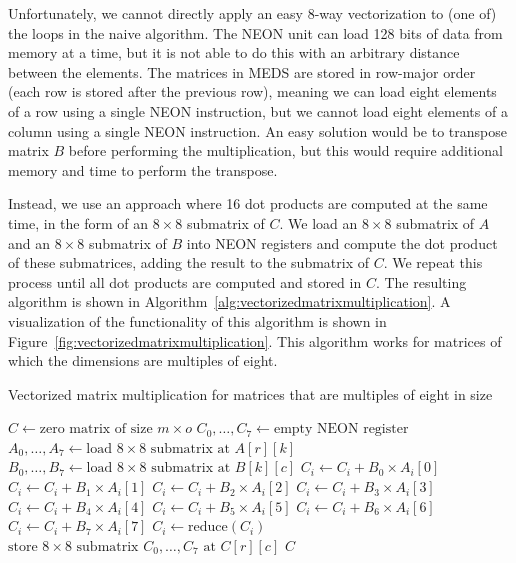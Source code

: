 \documentclass[11pt,a4paper]{report}
\theoremstyle{definition}
\begin{document}
Unfortunately, we cannot directly apply an easy 8-way vectorization to (one of) the loops in the naive algorithm. The NEON unit can load 128 bits of data from memory at a time, but it is not able to do this with an arbitrary distance between the elements. The matrices in MEDS are stored in row-major order (each row is stored after the previous row), meaning we can load eight elements of a row using a single NEON instruction, but we cannot load eight elements of a column using a single NEON instruction. An easy solution would be to transpose matrix $B$ before performing the multiplication, but this would require additional memory and time to perform the transpose.

Instead, we use an approach where 16 dot products are computed at the same time, in the form of an $8\times8$ submatrix of $C$. We load an $8\times8$ submatrix of $A$ and an $8\times8$ submatrix of $B$ into NEON registers and compute the dot product of these submatrices, adding the result to the submatrix of $C$. We repeat this process until all dot products are computed and stored in $C$. The resulting algorithm is shown in Algorithm~\ref{alg:vectorizedmatrixmultiplication}. A visualization of the functionality of this algorithm is shown in Figure~\ref{fig:vectorizedmatrixmultiplication}. This algorithm works for matrices of which the dimensions are multiples of eight.

\begin{algorithm}
  \caption{Vectorized matrix multiplication for matrices that are multiples of eight in size}
  \label{alg:vectorizedmatrixmultiplication}
  \begin{algorithmic}[1]
    \State $C \gets \text{zero matrix of size } m \times o$
    \State $C_0, \dots, C_7 \gets \text{empty NEON register}$
    \State $A_0, \dots, A_7 \gets \text{load } 8\times8 \text{ submatrix at } A[r][k]$
    \State $B_0, \dots, B_7 \gets \text{load } 8\times8 \text{ submatrix at } B[k][c]$
    \State $C_i \gets C_i + B_0 \times A_i[0]$
    \State $C_i \gets C_i + B_1 \times A_i[1]$
    \State $C_i \gets C_i + B_2 \times A_i[2]$
    \State $C_i \gets C_i + B_3 \times A_i[3]$
    \State $C_i \gets C_i + B_4 \times A_i[4]$
    \State $C_i \gets C_i + B_5 \times A_i[5]$
    \State $C_i \gets C_i + B_6 \times A_i[6]$
    \State $C_i \gets C_i + B_7 \times A_i[7]$
    \EndFor
    \EndFor
    \State $C_i \gets \text{reduce}(C_i)$
    \EndFor
    \State $\text{store } 8\times8 \text{ submatrix } C_0, \dots, C_7 \text{ at } C[r][c]$
    \EndFor
    \EndFor
    \State \Return $C$
    \EndFunction
  \end{algorithmic}
\end{algorithm}
\end{document}
